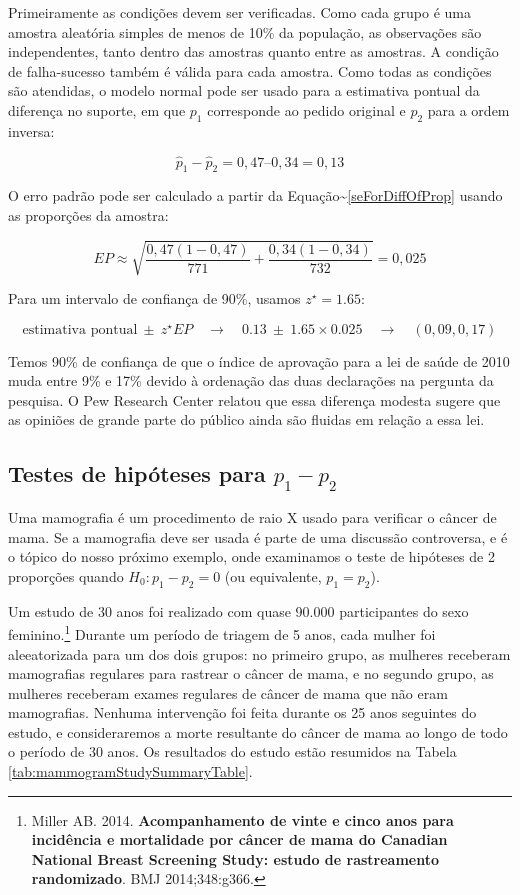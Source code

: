 \documentclass[
]{book}
\theoremstyle{definition}
\theoremstyle{definition}
\theoremstyle{definition}
\theoremstyle{definition}
\theoremstyle{remark}
\begin{document}
Primeiramente as condições devem ser verificadas. Como cada grupo é uma amostra aleatória simples de menos de 10\% da população, as observações são independentes, tanto dentro das amostras quanto entre as amostras. A condição de falha-sucesso também é válida para cada amostra. Como todas as condições são atendidas, o modelo normal pode ser usado para a estimativa pontual da diferença no suporte, em que \(p_1\) corresponde ao pedido original e \(p_2\) para a ordem inversa:

\[\hat{p}_{1} - \hat{p}_{2} = 0,47 – 0,34 = 0,13\]

O erro padrão pode ser calculado a partir da Equação\textasciitilde{}\eqref{seForDiffOfProp} usando as proporções da amostra:

\[EP \approx \sqrt{\frac{0,47(1-0,47)}{771} + \frac{0,34(1-0,34)}{732}} = 0,025\]

Para um intervalo de confiança de 90\%, usamos \(z^{\star} = 1.65\):

\[\text{estimativa pontual} \ \pm\ z^{\star}EP \quad \to \quad 0.13 \ \pm\ 1.65 \times  0.025 \quad \to \quad (0,09, 0,17)\]

Temos 90\% de confiança de que o índice de aprovação para a lei de saúde de 2010 muda entre 9\% e 17\% devido à ordenação das duas declarações na pergunta da pesquisa. O Pew Research Center relatou que essa diferença modesta sugere que as opiniões de grande parte do público ainda são fluidas em relação a essa lei.

\hypertarget{HTDifference}{%
\subsection{\texorpdfstring{Testes de hipóteses para \(p_1-p_2\)}{Testes de hipóteses para p\_1-p\_2}}\label{HTDifference}}

Uma mamografia é um procedimento de raio X usado para verificar o câncer de mama. Se a mamografia deve ser usada é parte de uma discussão controversa, e é o tópico do nosso próximo exemplo, onde examinamos o teste de hipóteses de 2 proporções quando \(H_0: p_1 - p_2 = 0\) (ou equivalente, \(p_1 = p_2\)).

Um estudo de 30 anos foi realizado com quase 90.000 participantes do sexo feminino.\footnote{Miller AB. 2014. \textbf{Acompanhamento de vinte e cinco anos para incidência e mortalidade por câncer de mama do Canadian National Breast Screening Study: estudo de rastreamento randomizado}. BMJ 2014;348:g366.} Durante um período de triagem de 5 anos, cada mulher foi aleeatorizada para um dos dois grupos: no primeiro grupo, as mulheres receberam mamografias regulares para rastrear o câncer de mama, e no segundo grupo, as mulheres receberam exames regulares de câncer de mama que não eram mamografias. Nenhuma intervenção foi feita durante os 25 anos seguintes do estudo, e consideraremos a morte resultante do câncer de mama ao longo de todo o período de 30 anos. Os resultados do estudo estão resumidos na Tabela \ref{tab:mammogramStudySummaryTable}.
\end{document}
